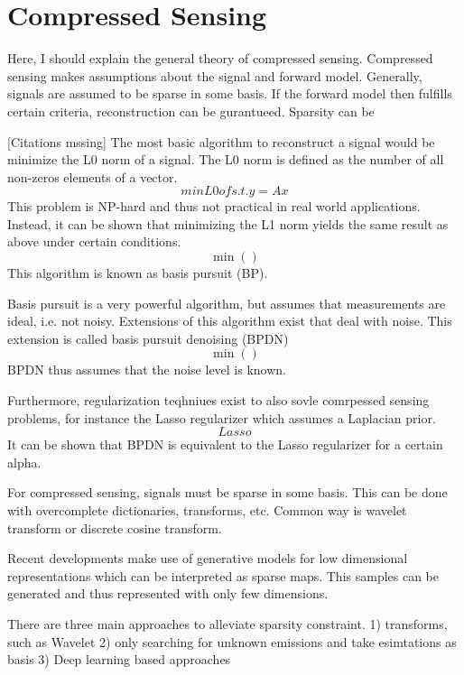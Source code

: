 \section{Compressed Sensing}
Here, I should explain the general theory of compressed sensing.
Compressed sensing makes assumptions about the signal and forward model.
Generally, signals are assumed to be sparse in some basis.
If the forward model then fulfills certain criteria, reconstruction can be gurantueed.
Sparsity can be 

[Citations mssing]
The most basic algorithm to reconstruct a signal would be minimize the L0 norm of a signal.
The L0 norm is defined as the number of all non-zeros elements of a vector.
\begin{equation}
    min L0 of  s.t. y = Ax
\end{equation}
This problem is NP-hard and thus not practical in real world applications.
Instead, it can be shown that minimizing the L1 norm yields the same result as above under certain conditions.
\begin{equation}
    \min()
\end{equation}
This algorithm is known as basis pursuit (BP).

Basis pursuit is a very powerful algorithm, but assumes that measurements are ideal, i.e. not noisy.
Extensions of this algorithm exist that deal with noise.
This extension is called basis pursuit denoising (BPDN)
\begin{equation}
    \min()
\end{equation}
BPDN thus assumes that the noise level is known.

Furthermore, regularization teqhniues exist to also sovle comrpessed sensing problems, for instance the Lasso regularizer which assumes a Laplacian prior.
\begin{equation}
    Lasso
\end{equation}
It can be shown that BPDN is equivalent to the Lasso regularizer for a certain alpha.

For compressed sensing, signals must be sparse in some basis.
This can be done with overcomplete dictionaries, transforms, etc.
Common way is wavelet transform or discrete cosine transform.

Recent developments make use of generative models for low dimensional representations which can be interpreted as sparse maps.
This samples can be generated and thus represented with only few dimensions.

There are three main approaches to alleviate sparsity constraint.
1) transforms, such as Wavelet
2) only searching for unknown emissions and take esimtations as basis
3) Deep learning based approaches


